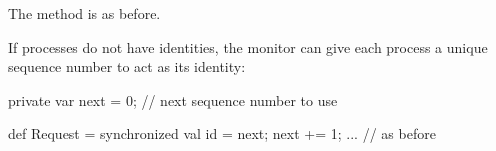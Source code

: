 
\begin{slide}

The  method is as before.

If processes do not have identities, the monitor can give each process a
unique sequence number to act as its identity:
%
\begin{scala}
private var next = 0; // next sequence number to use

def Request = synchronized{
  val id = next; next += 1;
  ... // as before
}
\end{scala}
\end{slide}
